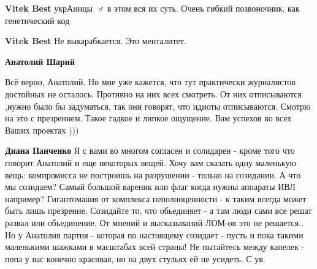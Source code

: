 \begin{itemize}
\begin{itemize}
\textbf{Vitek Best} укрАинцы 🤷♂️ в этом вся их суть. Очень гибкий позвоночник, как генетический код

 
\textbf{Vitek Best} Не выкарабкается. Это менталитет.

 
\textbf{Анатолий Шарий} 

Всё верно, Анатолий. Но мне уже кажется, что тут
практически журналистов достойных не осталось. Противно на них всех смотреть.
От них отписываются ,нужно было бы задуматься, так они говорят, что идиоты
отписываются. Смотрю на это с презрением. Такое гадкое и липкое ощущение. Вам
успехов во всех Ваших проектах )))

 
\textbf{Диана Панченко} Я с вами во многом согласен и солидарен - кроме того
что говорит Анатолий и еще некоторых вещей. Хочу вам сказать одну маленькую
вещь: компромисса не построишь на разрушении - только на созидании. А что мы
созидаем? Самый большой вареник или флаг когда нужны аппараты ИВЛ например?
Гигантомания от комплекса неполноценности - к таким всегда может быть лишь
презрение. Созидайте то, что обьединяет - а там люди сами все решат развал или
обьединение. От мнений и высказываний ЛОМ-ов это не решается.. Но у Анатолия
партия - которая по настоящему созидает - пусть и пока такими маленькими
шажками в масштабах всей страны! Не пытайтесь между капелек - попа у вас
конечно красивая, но на двух стульях ей не усидеть. С ув.

 

\end{itemize}
\end{itemize}
